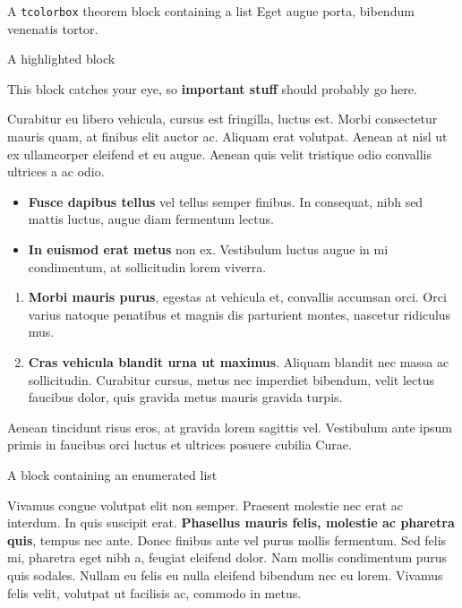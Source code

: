 \documentclass[final]{beamer}
\newlength{\colwidth}
\begin{document}
\begin{frame}[t]
\begin{columns}[t]
\begin{column}{\colwidth}
\begin{thm}{A \texttt{tcolorbox} theorem block containing a list}{}
				Eget augue porta, bibendum venenatis tortor.
				
			\end{thm}
			
			\begin{alertblock}{A highlighted block}
				
				This block catches your eye, so \textbf{important stuff} should probably go
				here.
				
				Curabitur eu libero vehicula, cursus est fringilla, luctus est. Morbi
				consectetur mauris quam, at finibus elit auctor ac. Aliquam erat volutpat.
				Aenean at nisl ut ex ullamcorper eleifend et eu augue. Aenean quis velit
				tristique odio convallis ultrices a ac odio.
				
				\begin{itemize}
					\item \textbf{Fusce dapibus tellus} vel tellus semper finibus. In
					consequat, nibh sed mattis luctus, augue diam fermentum lectus.
					\item \textbf{In euismod erat metus} non ex. Vestibulum luctus augue in
					mi condimentum, at sollicitudin lorem viverra.
				\end{itemize}
			
				\begin{enumerate}
					\item \textbf{Morbi mauris purus}, egestas at vehicula et, convallis
					accumsan orci. Orci varius natoque penatibus et magnis dis parturient
					montes, nascetur ridiculus mus.
					\item \textbf{Cras vehicula blandit urna ut maximus}. Aliquam blandit nec
					massa ac sollicitudin. Curabitur cursus, metus nec imperdiet bibendum,
					velit lectus faucibus dolor, quis gravida metus mauris gravida turpis.
				\end{enumerate}
				
				Aenean tincidunt risus eros, at gravida lorem sagittis vel. Vestibulum ante
				ipsum primis in faucibus orci luctus et ultrices posuere cubilia Curae.
				
			\end{alertblock}
			
			\begin{defbox}{A block containing an enumerated list}{}
				
				Vivamus congue volutpat elit non semper. Praesent molestie nec erat ac
				interdum. In quis suscipit erat. \textbf{Phasellus mauris felis, molestie
					ac pharetra quis}, tempus nec ante. Donec finibus ante vel purus mollis
				fermentum. Sed felis mi, pharetra eget nibh a, feugiat eleifend dolor. Nam
				mollis condimentum purus quis sodales. Nullam eu felis eu nulla eleifend
				bibendum nec eu lorem. Vivamus felis velit, volutpat ut facilisis ac,
				commodo in metus.
				

\end{defbox}
\end{column}
\end{columns}
\end{frame}
\end{document}
